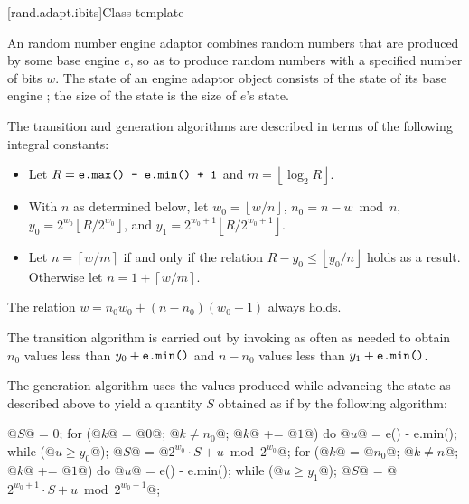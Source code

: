 
[rand.adapt.ibits]{Class template }%
%

\pnum
An 
random number engine adaptor
combines random numbers
that are produced by some base engine $e$,
so as to produce random numbers
with a specified number of bits $w$.
The state 
of an 
engine adaptor object 
consists of
 the state  of its base engine ;
the size of the state is
 the size of $e$'s state.

\pnum
The transition and generation algorithms
are described in terms
of the following integral constants:%
\begin{itemize}
 \item
   Let
     $R = \texttt{\protect e.max() - e.min() + 1}$
   and
     $m = \left\lfloor \log_2 R \right\rfloor$.
 \item
   With $n$ as determined below,
   let
     $w_0 = \left\lfloor w / n \right\rfloor$,
     $n_0 = n - w \bmod n$,
     $y_0 = 2^{w_0} \left\lfloor R / 2^{w_0} \right\rfloor$,
   and
     $y_1 = 2^{w_0 + 1} \left\lfloor R / 2^{w_0 + 1} \right\rfloor$.
 \item
   Let
     $n = \left\lceil w / m \right\rceil$
   if and only if the relation
     $R - y_0 \leq \left\lfloor y_0 / n \right\rfloor$
   holds as a result.
   Otherwise let
     $n = 1 + \left\lceil w / m \right\rceil$.
\end{itemize}
\begin{note}
 The relation
 $w = n_0 w_0 + (n - n_0)(w_0 + 1)$
 always holds.
\end{note}

\pnum
The transition algorithm
is carried out by invoking 
as often as needed to obtain $n_0$
values less than $y_0 + \texttt{\protect e.min()}$
and $n - n_0$ values less than $y_1 + \texttt{\protect e.min()}$.

\pnum
The generation algorithm
uses the values produced
while advancing the state as described above
to yield a quantity $S$
obtained as if by the following algorithm:
\begin{codeblock}
@$S$@ = 0;
for (@$k$@ = @$0$@; @$k \neq n_0$@; @$k$@ += @$1$@)  {
 do @$u$@ = e() - e.min(); while (@$u \ge y_0$@);
 @$S$@ = @$2^{w_0} \cdot S + u \bmod 2^{w_0}$@;
}
for (@$k$@ = @$n_0$@; @$k \neq n$@; @$k$@ += @$1$@)  {
 do @$u$@ = e() - e.min(); while (@$u \ge y_1$@);
 @$S$@ = @$2^{w_0 + 1} \cdot S + u \bmod 2^{w_0 + 1}$@;
}
\end{codeblock}

